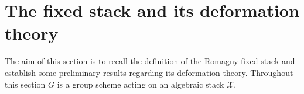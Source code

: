 \section{The fixed stack and its deformation theory}\label{rl-0002}

The aim of this section is to recall the definition of the Romagny fixed stack and establish some preliminary results regarding its deformation theory. Throughout this section \(G\) is a group scheme acting on an algebraic stack \(\mathcal X\).




